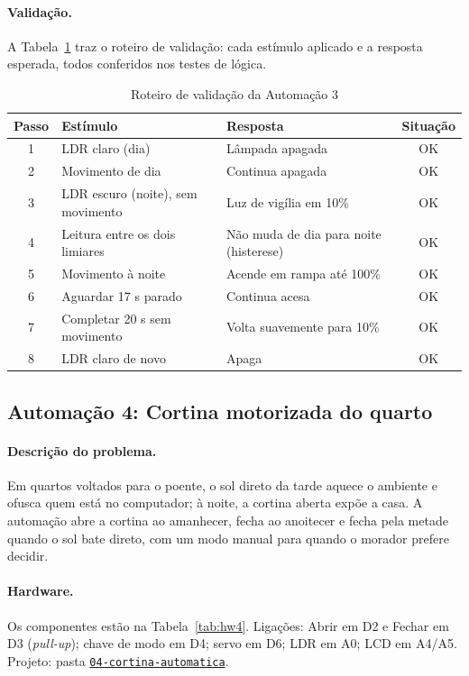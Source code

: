 \documentclass[12pt]{article}
\newcommand{\repositorio}{https://github.com/M-Beserra/Trabalho-sistemas-embarcadosA2}
\newcommand{\pasta}[1]{\href{\repositorio/tree/main/#1}{\texttt{#1}}}
\begin{document}
\paragraph{Validação.} A Tabela~\ref{tab:val3} traz o roteiro de validação: cada estímulo aplicado e a resposta esperada, todos conferidos nos testes de lógica.

\begin{table}[ht]
\centering
\caption{Roteiro de validação da Automação 3}\label{tab:val3}
\footnotesize
\begin{tabularx}{\textwidth}{cXXc}
\toprule
Passo & Estímulo & Resposta & Situação \\
\midrule
1 & LDR claro (dia) & Lâmpada apagada & OK \\
2 & Movimento de dia & Continua apagada & OK \\
3 & LDR escuro (noite), sem movimento & Luz de vigília em 10\% & OK \\
4 & Leitura entre os dois limiares & Não muda de dia para noite (histerese) & OK \\
5 & Movimento à noite & Acende em rampa até 100\% & OK \\
6 & Aguardar 17 s parado & Continua acesa & OK \\
7 & Completar 20 s sem movimento & Volta suavemente para 10\% & OK \\
8 & LDR claro de novo & Apaga & OK \\
\bottomrule
\end{tabularx}
\end{table}

\subsection{Automação 4: Cortina motorizada do quarto}\label{sub:a4}

\paragraph{Descrição do problema.} Em quartos voltados para o poente, o sol direto da tarde aquece o ambiente e ofusca quem está no computador; à noite, a cortina aberta expõe a casa. A automação abre a cortina ao amanhecer, fecha ao anoitecer e fecha pela metade quando o sol bate direto, com um modo manual para quando o morador prefere decidir.

\paragraph{Hardware.} Os componentes estão na Tabela~\ref{tab:hw4}. Ligações: Abrir em D2 e Fechar em D3 (\emph{pull-up}); chave de modo em D4; servo em D6; LDR em A0; LCD em A4/A5. Projeto: pasta \pasta{04-cortina-automatica}.
\end{document}
